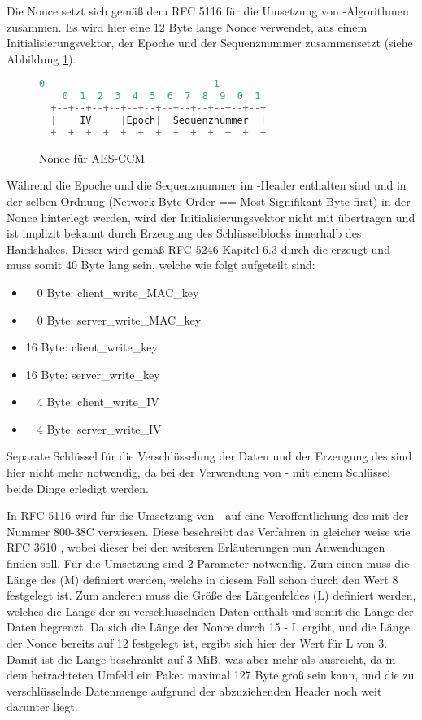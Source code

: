 Die Nonce setzt sich gemäß dem  RFC 5116 \cite{rfc5116} für die Umsetzung von -Algorithmen zusammen. Es wird hier eine 12 Byte lange
Nonce verwendet, aus einem Initialisierungsvektor, der Epoche und der Sequenznummer zusammensetzt (siehe Abbildung \ref{fig:aes_nonce}).
\begin{figure}[ht]
  \centering
  \begin{lstlisting}[language=c]
    0                             1
    0  1  2  3  4  5  6  7  8  9  0  1
  +--+--+--+--+--+--+--+--+--+--+--+--+
  |    IV     |Epoch|  Sequenznummer  |
  +--+--+--+--+--+--+--+--+--+--+--+--+
  \end{lstlisting}
  \caption{Nonce für AES-CCM}
  \label{fig:aes_nonce}
\end{figure}
Während die Epoche und die Sequenznummer im -Header enthalten sind und in der selben Ordnung (Network Byte Order == Most Signifikant
Byte first) in der Nonce hinterlegt werden, wird der Initialisierungsvektor nicht mit übertragen und ist implizit bekannt durch Erzeugung des
Schlüsselblocks innerhalb des Handshakes. Dieser wird gemäß RFC 5246 \cite{rfc5246} Kapitel 6.3 durch die  erzeugt und muss somit
40 Byte lang sein, welche wie folgt aufgeteilt sind:
\begin{itemize}
  \item ~~0 Byte: client\_write\_MAC\_key
  \item ~~0 Byte: server\_write\_MAC\_key
  \item 16 Byte: client\_write\_key
  \item 16 Byte: server\_write\_key
  \item ~~4 Byte: client\_write\_IV
  \item ~~4 Byte: server\_write\_IV
\end{itemize}
Separate Schlüssel für die Verschlüsselung der Daten und der Erzeugung des  sind hier nicht mehr notwendig, da bei der Verwendung
von - mit einem Schlüssel beide Dinge erledigt werden.

In RFC 5116 \cite{rfc5116} wird für die Umsetzung von - auf eine Veröffentlichung des  mit der Nummer 800-38C \cite{nsp3610} verwiesen.
Diese beschreibt das Verfahren in gleicher weise wie RFC 3610 \cite{rfc3610}, wobei dieser bei den weiteren Erläuterungen nun Anwendungen finden soll.
Für die Umsetzung sind 2 Parameter notwendig. Zum einen muss die Länge des  (M) definiert werden, welche in diesem Fall schon durch den Wert 8 festgelegt
ist. Zum anderen muss die Größe des Längenfeldes (L) definiert werden, welches die Länge der zu verschlüsselnden Daten enthält und somit die Länge der Daten begrenzt.
Da sich die Länge der Nonce durch 15 - L ergibt, und die Länge der Nonce bereits auf 12 festgelegt ist, ergibt sich hier der Wert für L von 3. 
Damit ist die Länge beschränkt auf 3 MiB, was aber mehr als ausreicht, da in dem betrachteten Umfeld ein Paket maximal 127 Byte groß sein kann, und die zu
verschlüsselnde Datenmenge aufgrund der abzuziehenden Header noch weit darunter liegt.

